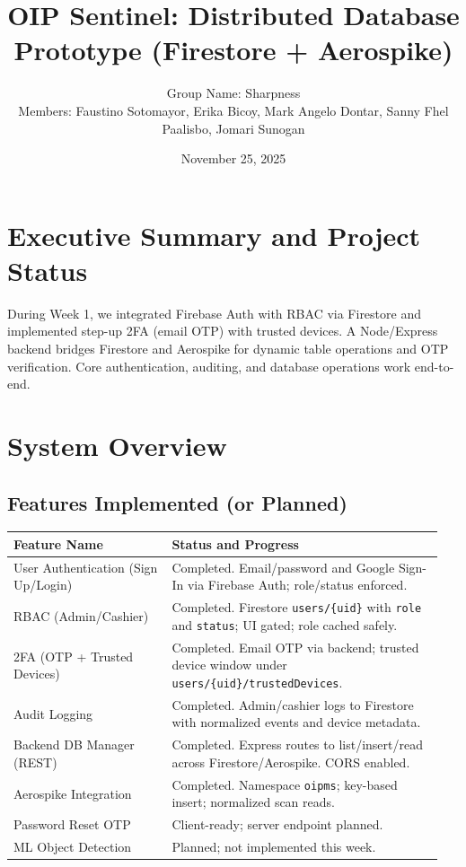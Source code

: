 \documentclass[12pt]{article}
\title{OIP Sentinel: Distributed Database Prototype (Firestore + Aerospike)}
\author{Group Name: Sharpness\\
Members: Faustino Sotomayor, Erika Bicoy, Mark Angelo Dontar, Sanny Fhel Paalisbo, Jomari Sunogan}
\date{November 25, 2025}
\begin{document}
\maketitle

\section{Executive Summary and Project Status}
During Week 1, we integrated Firebase Auth with RBAC via Firestore and implemented step-up 2FA (email OTP) with trusted devices. A Node/Express backend bridges Firestore and Aerospike for dynamic table operations and OTP verification. Core authentication, auditing, and database operations work end-to-end.

\section{System Overview}

\subsection{Features Implemented (or Planned)}
\begin{longtable}{p{0.35\linewidth} p{0.6\linewidth}}
\toprule
\textbf{Feature Name} & \textbf{Status and Progress} \\
\midrule
User Authentication (Sign Up/Login) &
Completed. Email/password and Google Sign-In via Firebase Auth; role/status enforced. \\
RBAC (Admin/Cashier) &
Completed. Firestore \texttt{users/\{uid\}} with \texttt{role} and \texttt{status}; UI gated; role cached safely. \\
2FA (OTP + Trusted Devices) &
Completed. Email OTP via backend; trusted device window under \texttt{users/\{uid\}/trustedDevices}. \\
Audit Logging &
Completed. Admin/cashier logs to Firestore with normalized events and device metadata. \\
Backend DB Manager (REST) &
Completed. Express routes to list/insert/read across Firestore/Aerospike. CORS enabled. \\
Aerospike Integration &
Completed. Namespace \texttt{oipms}; key-based insert; normalized scan reads. \\
Password Reset OTP &
Client-ready; server endpoint planned. \\
ML Object Detection &
Planned; not implemented this week. \\
\bottomrule
\end{longtable}
\end{document}
